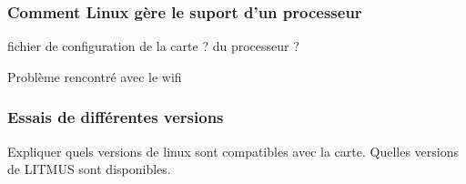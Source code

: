 \subsubsection{Comment Linux gère le suport d'un processeur}
fichier de configuration de la carte ? du processeur ?

Problème rencontré avec le wifi



\subsubsection{Essais de différentes versions}

Expliquer quels versions de linux sont compatibles avec la carte. Quelles versions de LITMUS sont disponibles.